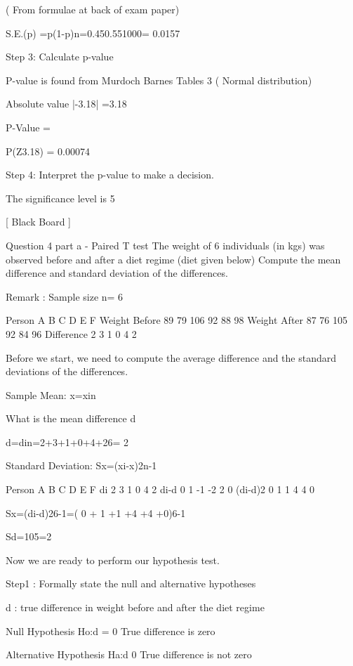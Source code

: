 ( From formulae at back of exam paper)
 
 S.E.(p) =p(1-p)n=0.450.551000= 0.0157
 
 
 
 
 
 
Step 3: Calculate p-value
 
P-value is found from Murdoch Barnes Tables 3 ( Normal distribution)
 
Absolute value  |-3.18| =3.18
 
P-Value = 
 
 
P(Z3.18) = 0.00074
 
 
Step 4: Interpret the p-value to make a decision.
 
The significance level is 5%
 
 
[ Black Board ]
 
 
Question 4 part a - Paired T test
The weight of 6 individuals (in kgs) was observed before and after a diet regime (diet given below)
Compute the mean difference and standard deviation of the differences.
 
Remark : Sample size n= 6
 
Person
A
B
C
D
E
F
Weight Before
89
79
106
92
88
98
Weight After
87
76
105
92
84
96
Difference
2
3
1
0
4
2
 
 
Before we start, we need to compute the average difference and the standard deviations of the differences. 
 
 

Sample Mean:           x=xin      
 
 
What is the mean difference d
 
  
d=din=2+3+1+0+4+26= 2
  
 
 
Standard Deviation:           Sx=(xi-x)2n-1      
 

Person
A
B
C
D
E
F
di
2
3
1
0
4
2
di-d
0
1
-1
-2
2
0
(di-d)2
0
1
1
4
4
0
 
 Sx=(di-d)26-1=( 0 + 1 +1 +4 +4 +0)6-1
 
 Sd=105=2 
 
Now we are ready to perform our hypothesis test.
 

Step1 : Formally state the null and alternative hypotheses
 
d : true difference in weight before and after the diet regime 
 
Null Hypothesis               Ho:d = 0        True difference is zero
 
Alternative Hypothesis      Ha:d 0       True difference is not zero 
 
